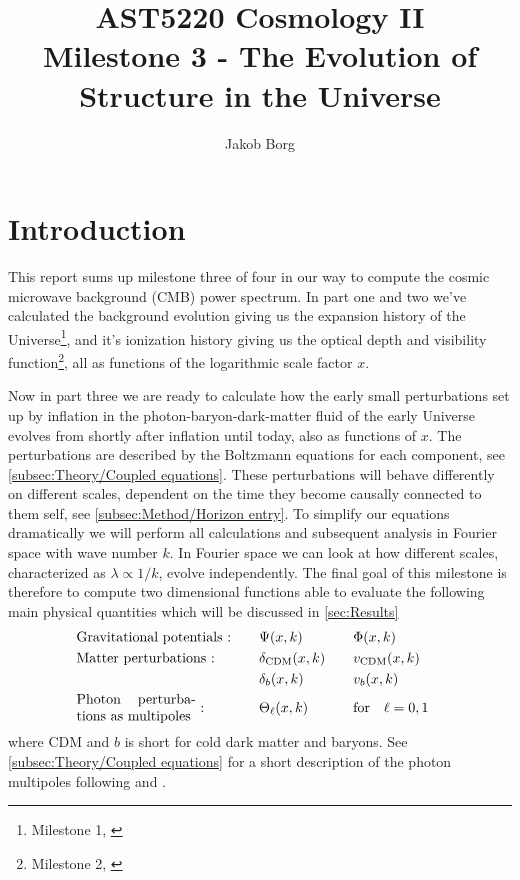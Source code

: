 \documentclass[10pt,a4paper]{article}
\title{AST5220 Cosmology \rm{II}\\ 
\vspace{5mm}Milestone 3 - The Evolution of Structure in the Universe}
\author{Jakob Borg}
\providecommand{\rCDM}
{
\rm{CDM}
}
\begin{document}
\maketitle
{}

\section{Introduction}
\label{sec:Introduction}
This report sums up milestone three of four in our way to compute the cosmic microwave background (CMB) power spectrum. In part one and two we've calculated the background evolution giving us the expansion history of the Universe\footnote{Milestone 1, \cite{milestone1}}, and it's ionization history giving us the optical depth and visibility function\footnote{Milestone 2, \cite{milestone2}}, all as functions of the logarithmic scale factor $x$.

Now in part three we are ready to calculate how the early small perturbations set up by inflation in the photon-baryon-dark-matter fluid of the early Universe evolves from shortly after inflation until today, also as functions of $x$. The perturbations are described by the Boltzmann equations for each component, see \cref{subsec:Theory/Coupled equations}. These perturbations will behave differently on different scales, dependent on the time they become causally connected to them self, see \cref{subsec:Method/Horizon entry}. To simplify our equations dramatically we will perform all calculations and subsequent analysis in Fourier space with wave number $k$. In Fourier space we can look at how different scales, characterized as $\lambda \propto 1/k$, evolve independently. The final goal of this milestone is therefore to compute two dimensional functions able to evaluate the following main physical quantities which will be discussed in \cref{sec:Results}
\begin{alignat*}{4}
  & \text{Gravitational potentials :} &\quad& \Psi(x,k) &\quad& \Phi(x,k) &
  \\
  & \text{Matter perturbations :}     &\quad& \delta_{\rCDM}(x,k) &\quad& v_{\rCDM}(x,k) &
  \\
  &                                  &\quad& \delta_{b}(x,k) &\quad& v_{b}(x,k) &
  \\
  & \text{\parbox{3cm}{Photon perturbations as multipoles} :}
                                  &\quad& \Theta_\ell(x,k) &\quad& \qfor* \ell = {0,1}&
\end{alignat*}%
where \rm{CDM} and $b$ is short for cold dark matter and baryons. See \cref{subsec:Theory/Coupled equations} for a short description of the photon multipoles following \cite{Calin} and \cite{Dodelson}.
\end{document}
